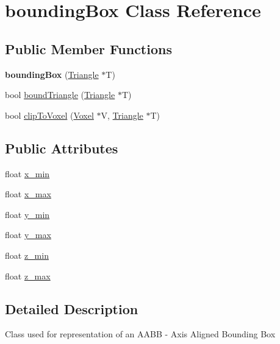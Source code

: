 \hypertarget{classbounding_box}{}\section{bounding\+Box Class Reference}
\label{classbounding_box}
\subsection*{Public Member Functions}
\begin{DoxyCompactItemize}
\item 
\mbox{\label{classbounding_box_ae9d37d9ed3a53e3c7fcb7dfaba2f5e07}} 
{\bfseries bounding\+Box} (\hyperlink{class_triangle}{Triangle} $\ast$T)
\item 
bool \hyperlink{classbounding_box_aa3b09cbb86a114fcbb3dba13a543efd6}{bound\+Triangle} (\hyperlink{class_triangle}{Triangle} $\ast$T)
\item 
bool \hyperlink{classbounding_box_ac37969db26fdc180d7ce2cf90cb1368a}{clip\+To\+Voxel} (\hyperlink{class_voxel}{Voxel} $\ast$V, \hyperlink{class_triangle}{Triangle} $\ast$T)
\end{DoxyCompactItemize}
\subsection*{Public Attributes}
\begin{DoxyCompactItemize}
\item 
float \hyperlink{classbounding_box_a6317b26fef72b8c5c8b172fcad689989}{x\+\_\+min}
\item 
float \hyperlink{classbounding_box_a4a04c24133f0348d4f6ea460678a6a4f}{x\+\_\+max}
\item 
float \hyperlink{classbounding_box_a62d9248f944ec4264ce204b96ad14788}{y\+\_\+min}
\item 
float \hyperlink{classbounding_box_a5c4c3748050e6f9978838040df5c3c16}{y\+\_\+max}
\item 
float \hyperlink{classbounding_box_a6204bf950a9f8191a3e1ef6a2afcc3d0}{z\+\_\+min}
\item 
float \hyperlink{classbounding_box_a99c8098d79169736c7cd7234fbea8d9a}{z\+\_\+max}
\end{DoxyCompactItemize}


\subsection{Detailed Description}
Class used for representation of an A\+A\+BB -\/ Axis Aligned Bounding Box 

